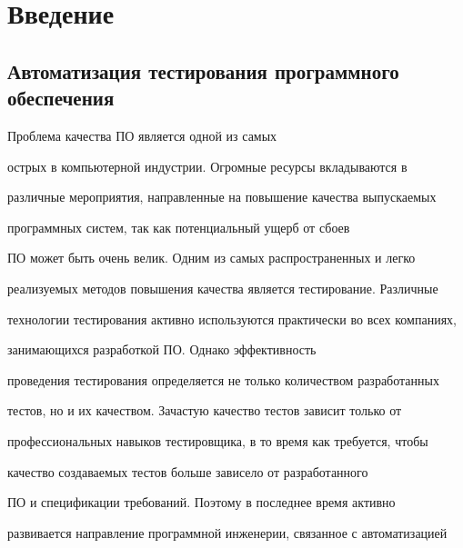       \thispagestyle{headings}











\section{Введение}





      \vspace*{-4pt}





\subsection{Автоматизация тестирования программного обеспечения}





     Проблема качества ПО является одной из самых


острых в компьютерной индустрии. Огромные ресурсы вкладываются в


различные мероприятия, направленные на повышение качества выпускаемых


программных систем, так как потенциальный ущерб от сбоев


ПО может быть очень велик. Одним из самых распространенных и легко


реализуемых методов повышения качества является тестирование. Различные


технологии тестирования активно используются практически во всех компаниях,


занимающихся разработкой ПО. Однако эффективность


проведения тестирования определяется не только количеством разработанных


тестов, но и их качеством. Зачастую качество тестов зависит только от


профессиональных навыков тестировщика, в то время как требуется, чтобы


качество создаваемых тестов больше зависело от разработанного


ПО и спецификации требований. Поэтому в последнее время активно


развивается направление программной инженерии, связанное с автоматизацией


